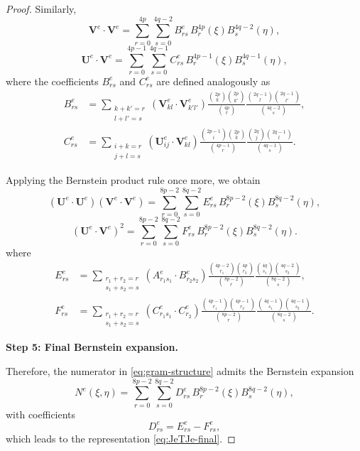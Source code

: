 \documentclass{jssc}
\begin{document}
\begin{proof}
Similarly,
\begin{equation}
\mathbf{V}^e \cdot \mathbf{V}^e
=
\sum_{r=0}^{4p}\sum_{s=0}^{4q-2}
B_{rs}^e \, B_r^{4p}(\xi) B_s^{4q-2}(\eta),
\end{equation}
\begin{equation}
\mathbf{U}^e \cdot \mathbf{V}^e
=
\sum_{r=0}^{4p-1}\sum_{s=0}^{4q-1}
C_{rs}^e \, B_r^{4p-1}(\xi) B_s^{4q-1}(\eta),
\end{equation}
where the coefficients $B_{rs}^e$ and $C_{rs}^e$ are defined analogously as
\begin{equation}
\begin{aligned}
     B^e_{rs}&=\sum_{\substack{k+k'=r\\l+l'=s}}(\mathbf{V}^e_{kl}\cdot\mathbf{V}^e_{k'l'})\frac{\binom{2p}{k}\binom{2p}{k'}}{\binom{4p}{r}}\frac{\binom{2q-1}{l}\binom{2q-1}{l'}}{\binom{4q-2}{s}},\\
     C^e_{rs}&=\sum_{\substack{i+k=r\\j+l=s}}(\mathbf{U}^e_{ij}\cdot\mathbf{V}^e_{kl})\frac{\binom{2p-1}{i}\binom{2p}{k}}{\binom{4p-1}{r}}\frac{\binom{2q}{j}\binom{2q-1}{l}}{\binom{4q-1}{s}}.
\end{aligned}
\end{equation}

Applying the Bernstein product rule once more, we obtain
\begin{equation}
(\mathbf{U}^e\cdot\mathbf{U}^e)(\mathbf{V}^e\cdot\mathbf{V}^e)
=
\sum_{r=0}^{8p-2}\sum_{s=0}^{8q-2}
E_{rs}^e \, B_r^{8p-2}(\xi) B_s^{8q-2}(\eta),
\end{equation}
\begin{equation}
(\mathbf{U}^e\cdot\mathbf{V}^e)^2
=
\sum_{r=0}^{8p-2}\sum_{s=0}^{8q-2}
F_{rs}^e \, B_r^{8p-2}(\xi) B_s^{8q-2}(\eta).
\end{equation}
where 
\begin{equation}
\begin{aligned}
    E^e_{rs}&=\sum_{\substack{r_1+r_2=r\\s_1+s_2=s}}(A^e_{r_1s_1}\cdot B^e_{r_2s_2})\frac{\binom{4p-2}{r_1}\binom{4p}{r_2}}{\binom{8p-2}{r}}\frac{\binom{4q}{s_1}\binom{4q-2}{s_2}}{\binom{8q-2}{s}},\\
    F^e_{rs}&=\sum_{\substack{r_1+r_2=r\\s_1+s_2=s}}(C^e_{r_1s_1}\cdot C^e_{r_2})\frac{\binom{4p-1}{r_1}\binom{4p-1}{r_2}}{\binom{8p-2}{r}}\frac{\binom{4q-1}{s_1}\binom{4q-1}{s_2}}{\binom{8q-2}{s}}.
\end{aligned}  
\end{equation}

\textbf{Step 5: Final Bernstein expansion.}

Therefore, the numerator in \eqref{eq:gram-structure} admits the Bernstein expansion
\begin{equation}
N^e(\xi,\eta)
=
\sum_{r=0}^{8p-2}\sum_{s=0}^{8q-2}
D_{rs}^e \, B_r^{8p-2}(\xi) B_s^{8q-2}(\eta),
\label{eq:bernstein_coefficients}
\end{equation}
with coefficients
\begin{equation}
D_{rs}^e = E_{rs}^e - F_{rs}^e,
\end{equation}
which leads to the representation \eqref{eq:JeTJe-final}.
\end{proof}
\end{document}
